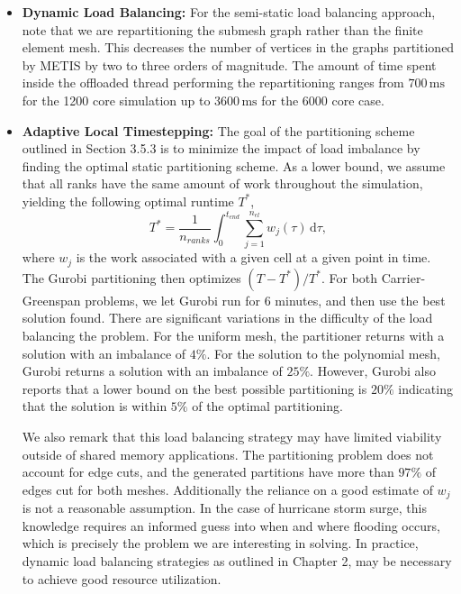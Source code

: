 \documentclass[10pt,letterpaper]{article}
\begin{document}
\begin{itemize}
\item {\bf Dynamic Load Balancing:} For the semi-static load balancing approach, note that we are repartitioning the submesh graph rather than the finite element mesh. This decreases the number of vertices in the graphs partitioned by METIS by two to three orders of magnitude. The amount of time spent inside the offloaded thread performing the repartitioning ranges from $700\,\mathrm{ms}$ for the 1200 core simulation up to $3600\,\mathrm{ms}$ for the 6000 core case.

\item {\bf Adaptive Local Timestepping:} The goal of the partitioning scheme outlined in Section 3.5.3 is to minimize the impact of load imbalance by finding the optimal static partitioning scheme.
As a lower bound, we assume that all ranks have the same amount of work throughout the simulation, yielding the following optimal runtime $T^*$,
\begin{equation*}
T^* = \frac{1}{n_{ranks}} \int_0^{t_{end}} \sum_{j=1}^{n_{el}} w_j(\tau) \,\mathrm{d}\tau,
\end{equation*}
where $w_j$ is the work associated with a given cell at a given point in time. The Gurobi partitioning then optimizes $(T - T^*)/T^*$. For both Carrier-Greenspan problems, we let Gurobi run for 6 minutes, and then use the best solution found. There are significant variations in the difficulty of the load balancing the problem. For the uniform mesh, the partitioner returns with a solution with an imbalance of $4\%$. For the solution to the polynomial mesh, Gurobi returns a solution with an imbalance of $25\%$. However, Gurobi also reports that a lower bound on the best possible partitioning is $20\%$ indicating that the solution is within $5\%$ of the optimal partitioning.

We also remark that this load balancing strategy may have limited viability outside of shared memory applications. The partitioning problem does not account for edge cuts, and the generated partitions have more than $97\%$ of edges cut for both meshes.
Additionally the reliance on a good estimate of $w_j$ is not a reasonable assumption. In the case of hurricane storm surge, this knowledge requires an informed guess into when and where flooding occurs, which is precisely the problem we are interesting in solving. In practice, dynamic load balancing strategies as outlined in Chapter 2, may be necessary to achieve good resource utilization.
\end{itemize}
\end{document}
